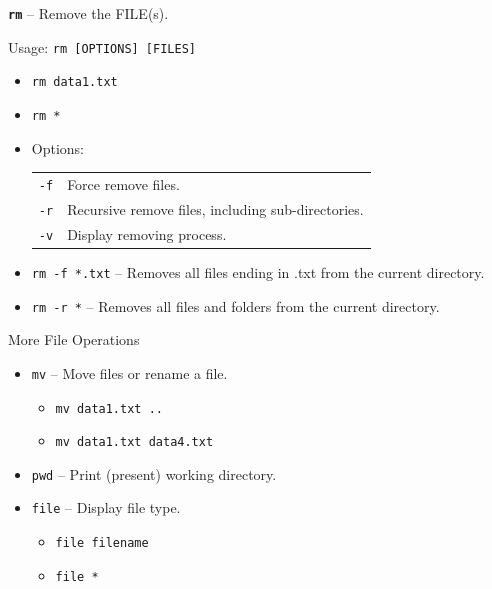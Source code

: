 \documentclass[14pt,aspectratio=1610]{beamer}
\begin{document}
\begin{frame}{\texttt{\textbf{rm}} -- Remove the FILE(s).}

Usage: \lstinline{rm [OPTIONS] [FILES]}

\begin{itemize}
\item \lstinline{rm data1.txt}
\item \lstinline{rm *}

\item Options:\\
  \begin{tabular}{l l}
    \lstinline{-f} & Force remove files.\\
    \lstinline{-r} & Recursive remove files, including sub-directories.\\
    \lstinline{-v} & Display removing process.\\
  \end{tabular}

\item \lstinline{rm -f *.txt} -- Removes all files ending in .txt from the current directory.
\item \lstinline{rm -r *}  -- Removes all files and folders from the current directory.
\end{itemize}
\end{frame}


\begin{frame}{More File Operations}
\begin{itemize}
\item \lstinline{mv} -- Move files or rename a file.
\begin{itemize}
  \item \lstinline{mv data1.txt ..}
  \item \lstinline{mv data1.txt data4.txt}
\end{itemize}
\item<2-> \lstinline{pwd} -- Print (present) working directory.
\item<3-> \lstinline{file} -- Display file type.
\begin{itemize}
  \item \lstinline{file filename}
  \item \lstinline{file *}
\end{itemize}
\end{itemize}
\end{frame}
\end{document}
